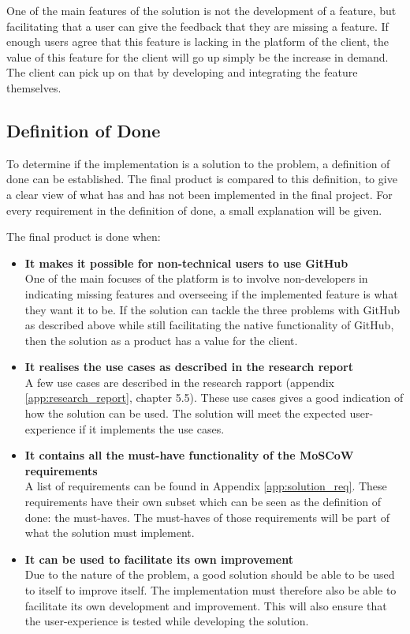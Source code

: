 One of the main features of the solution is not the development of a feature, but facilitating that a user can give the feedback that they are missing a feature. If enough users agree that this feature is lacking in the platform of the client, the value of this feature for the client will go up simply be the increase in demand. The client can pick up on that by developing and integrating the feature themselves.

\subsection{Definition of Done}
To determine if the implementation is a solution to the problem, a definition of done can be established. The final product is compared to this definition, to give a clear view of what has and has not been implemented in the final project. For every requirement in the definition of done, a small explanation will be given.

The final product is done when:
\begin{itemize}
    \item \textbf{It makes it possible for non-technical users to use GitHub}\\
            One of the main focuses of the platform is to involve non-developers in indicating missing features and overseeing if the implemented feature is what they want it to be. If the solution can tackle the three problems with GitHub as described above while still facilitating the native functionality of GitHub, then the solution as a product has a value for the client.
    \item \textbf{It realises the use cases as described in the research report}\\
            A few use cases are described in the research rapport (appendix \ref{app:research_report}, chapter 5.5). These use cases gives a good indication of how the solution can be used. The solution will meet the expected user-experience if it implements the use cases.
    \item \textbf{It contains all the must-have functionality of the MoSCoW requirements}\\
            A list of requirements can be found in Appendix \ref{app:solution_req}. These requirements have their own subset which can be seen as the definition of done: the must-haves. The must-haves of those requirements will be part of what the solution must implement.
    \item \textbf{It can be used to facilitate its own improvement}\\
            Due to the nature of the problem, a good solution should be able to be used to itself to improve itself. The implementation must therefore also be able to facilitate its own development and improvement. This will also ensure that the user-experience is tested while developing the solution.
\end{itemize}

